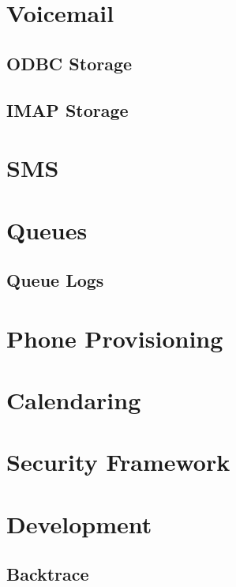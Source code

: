 \documentclass[12pt,a4]{report}
\begin{document}
\chapter{Voicemail}
  \section{ODBC Storage}
  \label{odbcstorage}
  
  \section{IMAP Storage}
  

\chapter{SMS}


\chapter{Queues}
  
  \section{Queue Logs}
  

\chapter{Phone Provisioning}
  

\chapter{Calendaring}
  

\chapter{Security Framework}
  

\chapter{Development}
  \section{Backtrace}
  



%
%
\end{document}

